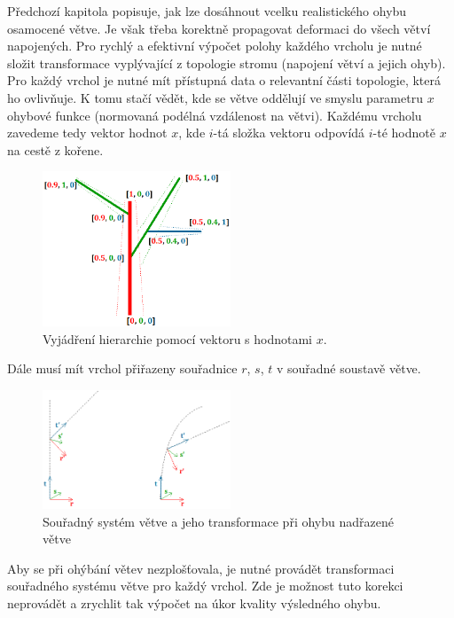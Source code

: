 Předchozí kapitola popisuje, jak lze dosáhnout vcelku realistického ohybu osamocené větve. Je však třeba korektně propagovat deformaci do všech větví napojených. Pro rychlý a efektivní výpočet polohy každého vrcholu je nutné složit transformace vyplývající z topologie stromu (napojení větví a jejich ohyb). Pro každý vrchol je nutné mít přístupná data o relevantní části topologie, která ho ovlivňuje. K tomu stačí vědět, kde se větve oddělují ve smyslu parametru $x$ ohybové funkce (normovaná podélná vzdálenost na větvi). Každému vrcholu zavedeme tedy vektor hodnot $x$, kde $i$-tá složka vektoru odpovídá $i$-té hodnotě $x$ na cestě z kořene.
 
\begin{figure}[!hbt]
\begin{center}
\includegraphics[width=0.5\textwidth]{./figures/branchHierarchy.png}
\end{center}
\caption[Vyjádření hierarchie]%
{ Vyjádření hierarchie pomocí vektoru s hodnotami $x$.
\label{fig:hierarchyCoords}
}
\end{figure}

Dále musí mít vrchol přiřazeny souřadnice $r$, $s$, $t$ v souřadné soustavě větve.
\begin{figure}[!hbt]
\begin{center}
\includegraphics[width=0.5\textwidth]{./figures/coordTransf.png}
\end{center}
\caption{ Souřadný systém větve a jeho transformace při ohybu nadřazené větve
\label{fig:transfCoordSys}
}
\end{figure}	 
Aby se při ohýbání větev nezplošťovala, je nutné provádět transformaci souřadného systému větve pro každý vrchol. Zde je možnost tuto korekci neprovádět a zrychlit tak výpočet na úkor kvality výsledného ohybu.

